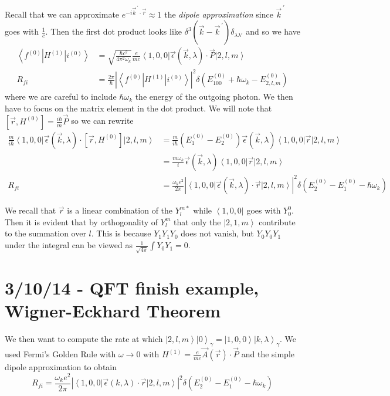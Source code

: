 \documentclass[10pt]{report}
\newcommand{\bra}[1]{\left<#1\right|}
\newcommand{\ket}[1]{\left|#1\right>}
\newcommand{\abs}[1]{\left|#1\right|}
\newcommand{\pvec}[1]{\vec{#1}^{\,\prime}}
\begin{document}
Recall that we can approximate $e^{-i\pvec{k}\cdot \vec{r}} \approx 1$ the \emph{dipole approximation} since $\pvec{k}$ goes with $\frac{1}{c}$. Then the first dot product looks like $\delta^3(\vec{k} - \pvec{k})\delta_{\lambda \lambda'}$ and so we have
\begin{align}
    \bra{f^{(0)}}H^{(1)}\ket{i^{(0)}} &= \sqrt{\frac{\hbar c^2}{4\pi^2\omega_k}}\frac{e}{mc}\bra{1,0,0}\vec{\epsilon}(\vec{k}, \lambda)\cdot \vec{P}\ket{2,l,m}\\
    R_{fi} &= \frac{2\pi}{\hbar}\abs{\bra{f^{(0)}}H^{(1)}\ket{i^{(0)}}}^2 \delta\left( E_{100}^{(0)} + \hbar\omega_k - E_{2,l,m}^{(0)} \right)
\end{align}
where we are careful to include $\hbar \omega_k$ the energy of the outgoing photon. We then have to focus on the matrix element in the dot product. We will note that $\left[ \vec{r}, H^{(0)} \right] = \frac{i\hbar}{m}\vec{P}$ so we can rewrite
\begin{align}
    \frac{m}{i\hbar}\bra{1,0,0}\vec{\epsilon}(\vec{k},\lambda)\cdot \left[ \vec{r},H^{(0)} \right]\ket{2,l,m} &= \frac{m}{i\hbar}\left( E_1^{(0)} - E_2^{(0)} \right)\vec{\epsilon}(\vec{k},\lambda)\bra{1,0,0}\vec{r}\ket{2,l,m}\\
    &= \frac{m\omega_k}{i}\vec{\epsilon}(\vec{k},\lambda)\bra{1,0,0}\vec{r}\ket{2,l,m}\\
    R_{fi} &= \frac{\omega_k e^2}{2\pi}\abs{\bra{1,0,0}\vec{\epsilon}(\vec{k},\lambda)\cdot \vec{r}\ket{2,l,m}}^2\delta\left( E_{2}^{(0)} - E_{1}^{(0)} - \hbar\omega_k \right)
\end{align}

We recall that $\vec{r}$ is a linear combination of the $Y_{l}^{m*}$ while $\bra{1,0,0}$ goes with $Y_{0}^0$. Then it is evident that by orthogonality of $Y_l^m$ that only the $\ket{2,1,m}$ contribute to the summation over $l$. This is because $Y_1 Y_1 Y_0$ does not vanish, but $Y_0Y_0Y_1$ under the integral can be viewed as $\frac{1}{\sqrt{4\pi}}\int Y_0Y_1 = 0$. 

\chapter{3/10/14 - QFT finish example, Wigner-Eckhard Theorem}

We then want to compute the rate at which $\ket{2,l,m}\ket{0}_{\gamma} = \ket{1,0,0}\ket{k,\lambda}_\gamma$. We used Fermi's Golden Rule with $\omega \to 0$ with $H^{(1)} = \frac{e}{mc}\vec{A}(\vec{r})\cdot \vec{P}$ and the simple dipole approximation to obtain
\begin{equation}
    R_{fi} = \frac{\omega_ke^2}{2\pi}\abs{\bra{1,0,0}\vec{\epsilon}(k,\lambda) \cdot \vec{r}\ket{2,l,m}}^2\delta\left( E_2^{(0)} - E_1^{(0)} - \hbar\omega_k \right)
\end{equation}
\end{document}
